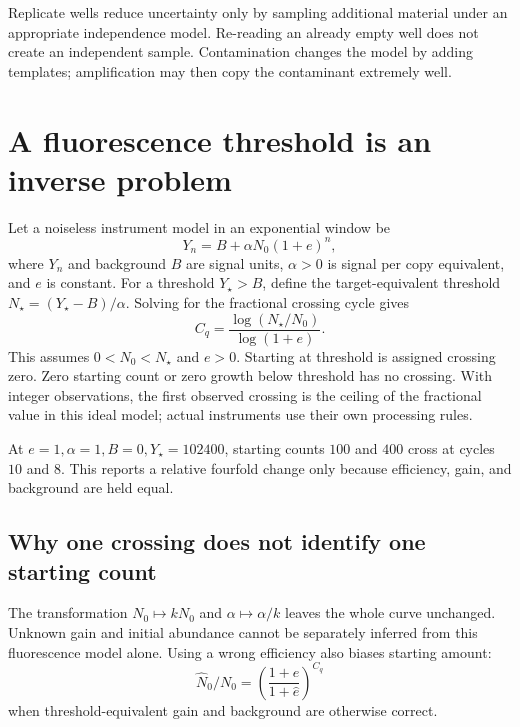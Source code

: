 Replicate wells reduce uncertainty only by sampling additional material under an appropriate independence model. Re-reading an already empty well does not create an independent sample. Contamination changes the model by adding templates; amplification may then copy the contaminant extremely well.

\section{A fluorescence threshold is an inverse problem}
Let a noiseless instrument model in an exponential window be
\begin{equation}
Y_n=B+\alpha N_0(1+e)^n,
\end{equation}
where $Y_n$ and background $B$ are signal units, $\alpha>0$ is signal per copy equivalent, and $e$ is constant. For a threshold $Y_\star>B$, define the target-equivalent threshold
$N_\star=(Y_\star-B)/\alpha$. Solving for the fractional crossing cycle gives
\begin{equation}
C_q=\frac{\log(N_\star/N_0)}{\log(1+e)}. \label{eq:cq}
\end{equation}
This assumes $0<N_0<N_\star$ and $e>0$. Starting at threshold is assigned crossing zero. Zero starting count or zero growth below threshold has no crossing. With integer observations, the first observed crossing is the ceiling of the fractional value in this ideal model; actual instruments use their own processing rules.

At $e=1,\alpha=1,B=0,Y_\star=102400$, starting counts $100$ and $400$ cross at cycles $10$ and $8$. This reports a relative fourfold change only because efficiency, gain, and background are held equal.

\begin{center}\end{center}

\subsection{Why one crossing does not identify one starting count}
The transformation $N_0\mapsto kN_0$ and $\alpha\mapsto\alpha/k$ leaves the whole curve unchanged. Unknown gain and initial abundance cannot be separately inferred from this fluorescence model alone. Using a wrong efficiency also biases starting amount:
\begin{equation}
\widehat N_0/N_0
=\left(\frac{1+e}{1+\widehat e}\right)^{C_q}
\end{equation}
when threshold-equivalent gain and background are otherwise correct.

